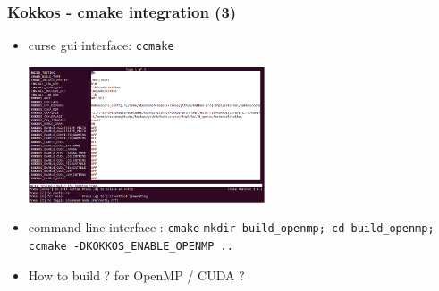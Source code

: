 \begin{frame}[fragile=singleslide]
  \frametitle{Kokkos - cmake integration (3)}

  \begin{itemize}
  \item curse gui interface: \texttt{ccmake}
    \begin{center}
      \includegraphics[width=7cm]{images/ccmake_kokkos}
    \end{center}
  \item command line interface : \texttt{cmake}
    \texttt{mkdir build\_openmp; cd build\_openmp; ccmake -DKOKKOS\_ENABLE\_OPENMP ..}
  \item How to build ? for OpenMP / CUDA ?
  \end{itemize}

\end{frame}
  
